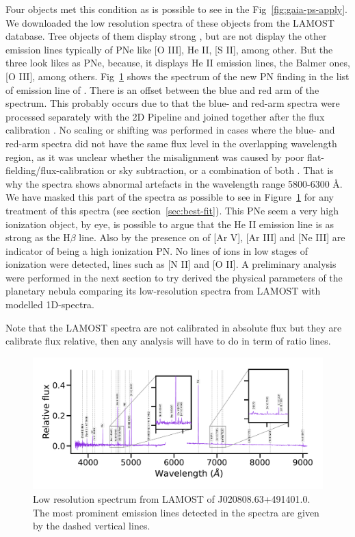 \documentclass[fleqn,usenatbib]{mnras}
\begin{document}
Four objects met this  condition as is possible to see in the Fig~\ref{fig:gaia-ps-apply}.
We downloaded the low resolution spectra of these objects from the LAMOST database. 
Tree objects of them display strong \ha{}, but are not display the other emission
lines typically of PNe like [O III], He II, [S II], among other. But the three look likes as PNe,
because, it displays He II emission lines, the Balmer ones, [O III], among others.
Fig~\ref{fig:spectra} shows the spectrum of the new PN finding in the list of emission line of
\citet{Skoda:2020}. There is an offset between the blue and red arm of the spectrum. This
probably occurs due to that the blue- and red-arm spectra were processed separately
with the 2D Pipeline and joined together after the ﬂux calibration \citep{Xiang:2015}. No
scaling or shifting was performed in cases where the blue- and
red-arm spectra did not have the same ﬂux level in the
overlapping wavelength region, as it was unclear whether the
misalignment was caused by poor ﬂat-ﬁelding/ﬂux-calibration
or sky subtraction, or a combination of both \citep{Chen:2016}. That is why the spectra shows
abnormal artefacts in the wavelength range 5800-6300 \AA. We have masked this part of
the spectra as possible to see in Figure~\ref{fig:spectra} for any treatment of
this spectra (see section~\ref{sec:best-fit}).
This PNe seem a very high ionization object, by eye, is possible to argue
that the He II emission line is as strong as the H$\beta$ line.
Also by the presence on of [Ar V], [Ar III] and [Ne III] are indicator of being a high
ionization PN. No lines of ions in low stages
of ionization were detected, lines such as [N II] and [O II]. A preliminary analysis
were performed in the next section to try derived the physical parameters of the planetary nebula
comparing its low-resolution spectra from LAMOST with modelled 1D-spectra.


Note that the LAMOST spectra are not calibrated in absolute flux but they are calibrate flux relative,
then any analysis will have to do in term of ratio lines. 

\begin{figure}
\centering
  \includegraphics[width=\linewidth]{Figs/spec-56581-VB031N50V1_sp08-218.pdf}
  \caption{Low resolution spectrum from LAMOST of J020808.63+491401.0.
    The most prominent emission lines detected in the spectra are given by the dashed vertical
    lines.} 
  \label{fig:spectra}
\end{figure}
\end{document}
